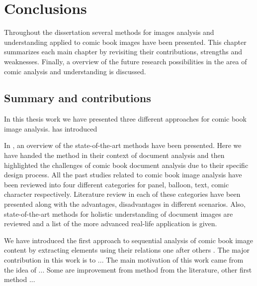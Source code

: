 \chapter{Conclusions} %
\label{chap:conclusions}

Throughout the dissertation several methods for images analysis and understanding applied to comic book images have been presented.
This chapter summarizes each main chapter by revisiting their contributions, strengths and weaknesses.
Finally, a overview of the future research possibilities in the area of comic analysis and understanding is discussed.

\section{Summary and contributions}
\label{conclusions:summary}



In this thesis work we have presented three different approaches for comic book image analysis.  has introduced %


In , an overview of the state-of-the-art methods have been presented. Here we have handed the method in their context of document analysis and then highlighted the challenges of comic book document analysis due to their specific design process.
All the past studies related to comic book image analysis have been reviewed into four different categories for panel, balloon, text, comic character respectively.
Literature review in each of these categories have been presented along with the advantages, disadvantages in different scenarios.
Also, state-of-the-art methods for holistic understanding of document images are reviewed and a list of the more advanced real-life application is given.

We have introduced the first approach to sequential analysis of comic book image content by extracting elements using their relations one after others .
The major contribution in this work is to ...
The main motivation of this work came from the idea of ...
Some are improvement from method from the literature, other first method ...

